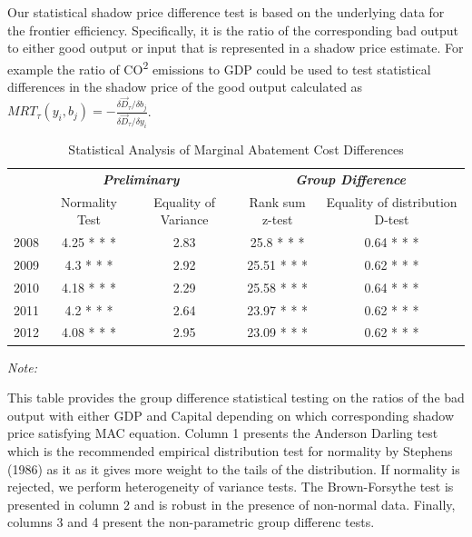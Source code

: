 \documentclass[
  10pt,
]{article}
\begin{document}
Our statistical shadow price difference test is based on the underlying
data for the frontier efficiency. Specifically, it is the ratio of the
corresponding bad output to either good output or input that is
represented in a shadow price estimate. For example the ratio of
CO\textsuperscript{2} emissions to GDP could be used to test statistical
differences in the shadow price of the good output calculated as
\(MRT_{\tau}(y_{i},b_{j})=-\frac{\delta \vec{D}_{\tau}/\delta b_{j}}{\delta \vec{D}_{\tau}/\delta y_{i}}\).

\begin{table}[H]

\caption{\label{tab:Test1}Statistical Analysis of Marginal Abatement Cost Differences}
\centering
\begin{threeparttable}
\begin{tabular}[t]{lcccc}
\toprule
\multicolumn{1}{c}{\em{\textbf{}}} & \multicolumn{2}{c}{\em{\textbf{Preliminary}}} & \multicolumn{2}{c}{\em{\textbf{Group Difference }}} \\
\cmidrule(l{3pt}r{3pt}){2-3} \cmidrule(l{3pt}r{3pt}){4-5}
  & Normality Test & Equality of Variance & Rank sum z-test & Equality of distribution D-test\\
\midrule
2008 & 4.25 * * * & 2.83 & 25.8 * * * & 0.64 * * *\\
2009 & 4.3 * * * & 2.92 & 25.51 * * * & 0.62 * * *\\
2010 & 4.18 * * * & 2.29 & 25.58 * * * & 0.64 * * *\\
2011 & 4.2 * * * & 2.64 & 23.97 * * * & 0.62 * * *\\
2012 & 4.08 * * * & 2.95 & 23.09 * * * & 0.62 * * *\\
\bottomrule
\end{tabular}
\begin{tablenotes}
\item \textit{Note: } 
\item This table provides the group difference statistical testing on the ratios of the bad output with either GDP and Capital depending on which corresponding shadow price satisfying MAC equation. Column 1 presents the Anderson Darling test which is the recommended empirical distribution test for normality by Stephens (1986) as it as it gives more weight to the tails of the distribution.  If normality is rejected, we perform heterogeneity of variance tests. The Brown-Forsythe test is presented in column 2 and is robust in the presence of non-normal data. Finally, columns 3 and 4 present the non-parametric group differenc tests.
\end{tablenotes}
\end{threeparttable}
\end{table}
\end{document}
